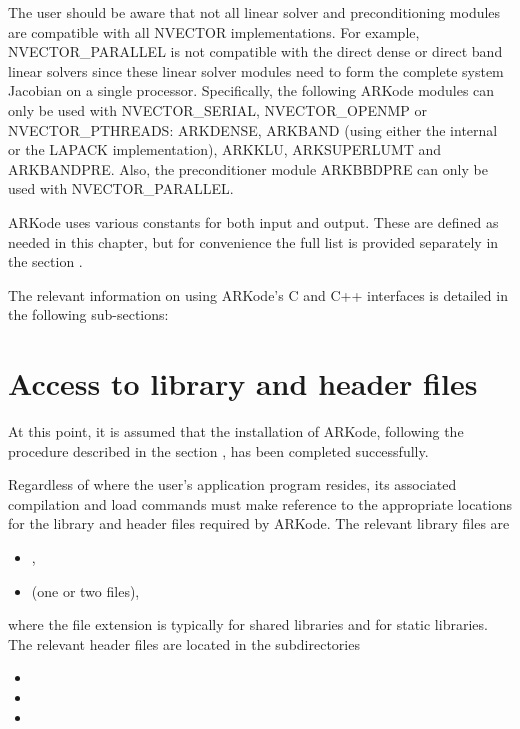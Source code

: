 \documentclass[letterpaper,10pt,english]{sphinxmanual}
\begin{document}
The user should be aware that not all linear solver and
preconditioning modules are compatible with all NVECTOR
implementations.  For example, NVECTOR\_PARALLEL is not compatible with
the direct dense or direct band linear solvers since these linear
solver modules need to form the complete system Jacobian on a single
processor.  Specifically, the following ARKode modules can only be
used with NVECTOR\_SERIAL, NVECTOR\_OPENMP or NVECTOR\_PTHREADS: ARKDENSE,
ARKBAND (using either the internal or the LAPACK implementation),
ARKKLU, ARKSUPERLUMT and ARKBANDPRE. Also, the preconditioner
module ARKBBDPRE can only be used with NVECTOR\_PARALLEL.

ARKode uses various constants for both input and output. These are
defined as needed in this chapter, but for convenience the full list
is provided separately in the section {\hyperref[Constants:constants]{\emph{}}}.

The relevant information on using ARKode's C and C++ interfaces is
detailed in the following sub-sections:


\section{Access to library and header files}
\label{c_interface/General:access-to-library-and-header-files}\label{c_interface/General:cinterface-headers}\label{c_interface/General::doc}
At this point, it is assumed that the installation of ARKode,
following the procedure described in the section {\hyperref[Install:installation]{\emph{}}},
has been completed successfully.

Regardless of where the user's application program resides, its
associated compilation and load commands must make reference to the
appropriate locations for the library and header files required by
ARKode. The relevant library files are
\begin{itemize}
\item {} 
,

\item {} 
 (one or two files),

\end{itemize}

where the file extension  is typically  for shared
libraries and  for static libraries.  The relevant header files
are located in the subdirectories
\begin{itemize}
\item {} 

\item {} 

\item {} 

\end{itemize}
\end{document}
